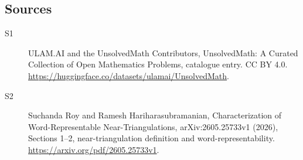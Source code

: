\documentclass[11pt]{article}
\begin{document}
\subsection{Sources}
\begin{description}
\item[\hypertarget{source:statement:1}{S1}] ULAM.AI and the UnsolvedMath Contributors, UnsolvedMath: A Curated Collection of Open Mathematics Problems, catalogue entry. CC BY 4.0. \url{https://huggingface.co/datasets/ulamai/UnsolvedMath}.
\item[\hypertarget{source:statement:2}{S2}] Suchanda Roy and Ramesh Hariharasubramanian, Characterization of Word-Representable Near-Triangulations, arXiv:2605.25733v1 (2026), Sections 1--2, near-triangulation definition and word-representability. \url{https://arxiv.org/pdf/2605.25733v1}.
\end{description}
\label{end:statement}
\end{document}
